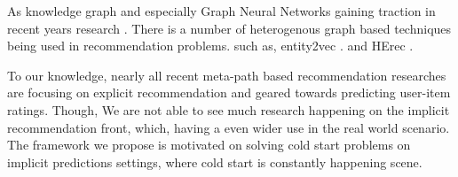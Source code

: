 As knowledge graph and especially Graph Neural Networks gaining traction in recent years research \cite{wu2019comprehensive}. There is a number of heterogenous graph based techniques being used in recommendation problems. such as, entity2vec \cite{palumbo2017entity2rec}. and HErec \cite{shi2018heterogeneous}. 

To our knowledge, nearly all recent meta-path based recommendation researches are focusing on explicit recommendation and geared towards predicting user-item ratings. Though, We are not able to see much research happening on the implicit recommendation front, which,  having a even wider use in the real world scenario. The framework we propose is motivated on solving cold start problems on implicit predictions settings, where cold start is constantly happening scene. 



